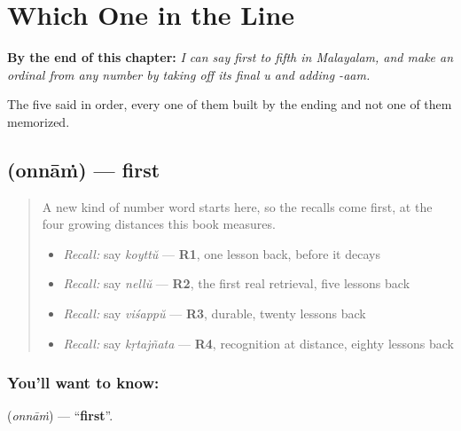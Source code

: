 
\chapter{Which One in the Line}
\label{ch:ml-ordinals}

\begin{chapteropening}
\textbf{By the end of this chapter:} \emph{I can say first to fifth in Malayalam, and make an ordinal from any number by taking off its final u and adding -aam.}

The five said in order, every one of them built by the ending and not one of them memorized.
\end{chapteropening}

\section[\texorpdfstring{\ml{ഒന്നാം} (onnāṁ)}{ഒന്നാം (onnāṁ)}]{ (onnāṁ) — first}

\label{lesson:ML-C67-first}



\begin{quote}
A new kind of number word starts here, so the recalls come first, at the four growing distances this book measures.

\begin{itemize}
\raggedright
  \item \emph{Recall:} say \emph{koyttŭ} — \textbf{R1}, one lesson back, before it decays
  \item \emph{Recall:} say \emph{nellŭ} — \textbf{R2}, the first real retrieval, five lessons back
  \item \emph{Recall:} say \emph{viśappŭ} — \textbf{R3}, durable, twenty lessons back
  \item \emph{Recall:} say \emph{kṛtajñata} — \textbf{R4}, recognition at distance, eighty lessons back
\end{itemize}
\end{quote}

\subsection*{You'll want to know: }
\textbf{} (\emph{onnāṁ}) — \textquotedblleft{}\textbf{first}\textquotedblright{}.

